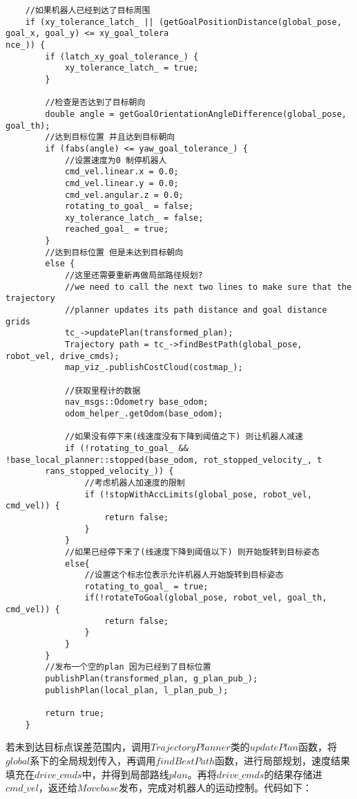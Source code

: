 \documentclass[9pt, oneside]{book}
\begin{document}
\footnotesize
\begin{verbatim}
    //如果机器人已经到达了目标周围
    if (xy_tolerance_latch_ || (getGoalPositionDistance(global_pose, goal_x, goal_y) <= xy_goal_tolera
nce_)) {
        if (latch_xy_goal_tolerance_) {
            xy_tolerance_latch_ = true;
        }

        //检查是否达到了目标朝向
        double angle = getGoalOrientationAngleDifference(global_pose, goal_th);
        //达到目标位置 并且达到目标朝向
        if (fabs(angle) <= yaw_goal_tolerance_) {
            //设置速度为0 制停机器人
            cmd_vel.linear.x = 0.0;
            cmd_vel.linear.y = 0.0;
            cmd_vel.angular.z = 0.0;
            rotating_to_goal_ = false;
            xy_tolerance_latch_ = false;
            reached_goal_ = true;
        }
        //达到目标位置 但是未达到目标朝向
        else {
            //这里还需要重新再做局部路径规划?
            //we need to call the next two lines to make sure that the trajectory
            //planner updates its path distance and goal distance grids
            tc_->updatePlan(transformed_plan);
            Trajectory path = tc_->findBestPath(global_pose, robot_vel, drive_cmds);
            map_viz_.publishCostCloud(costmap_);

            //获取里程计的数据
            nav_msgs::Odometry base_odom;
            odom_helper_.getOdom(base_odom);

            //如果没有停下来(线速度没有下降到阈值之下) 则让机器人减速
            if (!rotating_to_goal_ && !base_local_planner::stopped(base_odom, rot_stopped_velocity_, t
        rans_stopped_velocity_)) {
                //考虑机器人加速度的限制
                if (!stopWithAccLimits(global_pose, robot_vel, cmd_vel)) {
                    return false;
                }
            }
            //如果已经停下来了(线速度下降到阈值以下) 则开始旋转到目标姿态
            else{
                //设置这个标志位表示允许机器人开始旋转到目标姿态
                rotating_to_goal_ = true;
                if(!rotateToGoal(global_pose, robot_vel, goal_th, cmd_vel)) {
                    return false;
                }
            }
        }
        //发布一个空的plan 因为已经到了目标位置
        publishPlan(transformed_plan, g_plan_pub_);
        publishPlan(local_plan, l_plan_pub_);

        return true;
    }
\end{verbatim}
\normalsize

若未到达目标点误差范围内，调用$TrajectoryPlanner$类的$updatePlan$函数，将$global$系下的全局规划传入，再调用$findBestPath$函数，进行局部规划，速度结果填充在$drive\_cmds$中，并得到局部路线$plan$。再将$drive\_cmds$的结果存储进$cmd\_vel$，返还给$Movebase$发布，完成对机器人的运动控制。代码如下：
\end{document}
